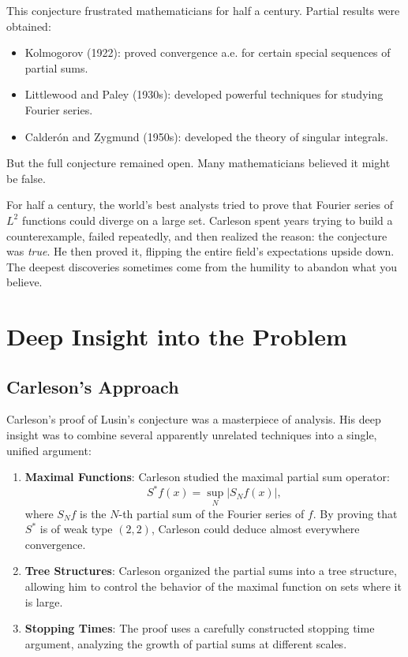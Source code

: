 This conjecture frustrated mathematicians for half a century. Partial results were obtained:
\begin{itemize}
\item Kolmogorov (1922): proved convergence a.e. for certain special sequences of partial sums.
\item Littlewood and Paley (1930s): developed powerful techniques for studying Fourier series.
\item Calder\'on and Zygmund (1950s): developed the theory of singular integrals.
\end{itemize}

But the full conjecture remained open. Many mathematicians believed it might be false.

\begin{bigidea}
For half a century, the world's best analysts tried to prove that Fourier series of $L^2$ functions could diverge on a large set. Carleson spent years trying to build a counterexample, failed repeatedly, and then realized the reason: the conjecture was \emph{true}. He then proved it, flipping the entire field's expectations upside down. The deepest discoveries sometimes come from the humility to abandon what you believe.
\end{bigidea}

\section{Deep Insight into the Problem}

\subsection{Carleson's Approach}

Carleson's proof of Lusin's conjecture was a masterpiece of analysis. His deep insight was to combine several apparently unrelated techniques into a single, unified argument:

\begin{enumerate}
\item \textbf{Maximal Functions}: Carleson studied the maximal partial sum operator:
\[
S^* f(x) = \sup_N |S_N f(x)|,
\]
where $S_N f$ is the $N$-th partial sum of the Fourier series of $f$. By proving that $S^*$ is of weak type $(2,2)$, Carleson could deduce almost everywhere convergence.

\item \textbf{Tree Structures}: Carleson organized the partial sums into a tree structure, allowing him to control the behavior of the maximal function on sets where it is large.

\item \textbf{Stopping Times}: The proof uses a carefully constructed stopping time argument, analyzing the growth of partial sums at different scales.
\end{enumerate}


